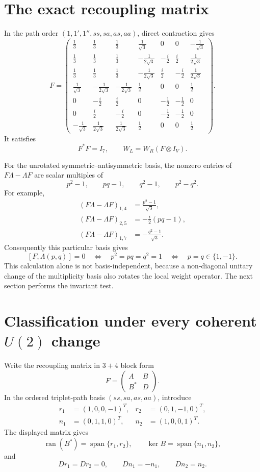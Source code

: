 \documentclass{article}
\newcommand{\Span}{\operatorname{span}}
\begin{document}
\section{The exact recoupling matrix}

In the path order $(1,1',1'',ss,sa,as,aa)$, direct contraction gives
\[
F=
\begin{pmatrix}
 \frac13&\frac13&\frac13&\frac1{\sqrt3}&0&0&-\frac1{\sqrt3}\\
 \frac13&\frac13&\frac13&-\frac1{2\sqrt3}&-\frac i2&\frac i2&\frac1{2\sqrt3}\\
 \frac13&\frac13&\frac13&-\frac1{2\sqrt3}&\frac i2&-\frac i2&\frac1{2\sqrt3}\\
 \frac1{\sqrt3}&-\frac1{2\sqrt3}&-\frac1{2\sqrt3}&\frac12&0&0&\frac12\\
 0&-\frac i2&\frac i2&0&-\frac12&-\frac12&0\\
 0&\frac i2&-\frac i2&0&-\frac12&-\frac12&0\\
 -\frac1{\sqrt3}&\frac1{2\sqrt3}&\frac1{2\sqrt3}&\frac12&0&0&\frac12
\end{pmatrix}.
\]
It satisfies
\[
F^*F=I_7,
\qquad
W_L=W_R(F\otimes I_V).
\]

For the unrotated symmetric--antisymmetric basis, the nonzero entries of
$F\Lambda-\Lambda F$ are scalar multiples of
\[
p^2-1,\qquad pq-1,\qquad q^2-1,\qquad p^2-q^2.
\]
For example,
\begin{align*}
(F\Lambda-\Lambda F)_{1,4}&=\frac{p^2-1}{\sqrt3},\\
(F\Lambda-\Lambda F)_{2,5}&=-\frac i2(pq-1),\\
(F\Lambda-\Lambda F)_{1,7}&=-\frac{q^2-1}{\sqrt3}.
\end{align*}
Consequently this particular basis gives
\[
[F,\Lambda(p,q)]=0
\quad\Longleftrightarrow\quad
p^2=pq=q^2=1
\quad\Longleftrightarrow\quad
p=q\in\{1,-1\}.
\]
This calculation alone is not basis-independent, because a non-diagonal
unitary change of the multiplicity basis also rotates the local weight
operator. The next section performs the invariant test.

\section{Classification under every coherent $U(2)$ change}

Write the recoupling matrix in $3+4$ block form
\[
F=\begin{pmatrix}A&B\\B^*&D\end{pmatrix}.
\]
In the ordered triplet-path basis $(ss,sa,as,aa)$, introduce
\begin{align*}
r_1&=(1,0,0,-1)^T,&
r_2&=(0,1,-1,0)^T,\\
n_1&=(0,1,1,0)^T,&
n_2&=(1,0,0,1)^T.
\end{align*}
The displayed matrix gives
\[
\operatorname{ran}(B^*)=\Span\{r_1,r_2\},
\qquad
\ker B=\Span\{n_1,n_2\},
\]
and
\[
Dr_1=Dr_2=0,
\qquad
Dn_1=-n_1,
\qquad
Dn_2=n_2.
\]
\end{document}
